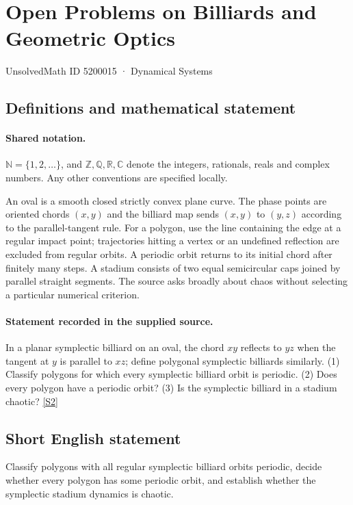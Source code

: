 \documentclass[11pt]{article}
\newcommand{\sref}[2]{\hyperlink{source:#1:#2}{[S#2]}}
\begin{document}
\setcounter{section}{5200014}
\section{Open Problems on Billiards and Geometric Optics}\label{5200015}
{\small\sffamily UnsolvedMath ID 5200015 · Dynamical Systems}
\subsection{Definitions and mathematical statement}

\paragraph{Shared notation.}$\mathbb N=\{1,2,\ldots\}$, and $\mathbb Z,\mathbb Q,\mathbb R,\mathbb C$ denote the integers, rationals, reals and complex numbers. Any other conventions are specified locally.


An oval is a smooth closed strictly convex plane curve. The phase points are oriented chords $(x,y)$ and the billiard map sends $(x,y)$ to $(y,z)$ according to the parallel-tangent rule. For a polygon, use the line containing the edge at a regular impact point; trajectories hitting a vertex or an undefined reflection are excluded from regular orbits. A periodic orbit returns to its initial chord after finitely many steps. A stadium consists of two equal semicircular caps joined by parallel straight segments. The source asks broadly about chaos without selecting a particular numerical criterion.
\paragraph{Statement recorded in the supplied source.}
In a planar symplectic billiard on an oval, the chord $xy$ reflects to $yz$ when the tangent at $y$ is parallel to $xz$; define polygonal symplectic billiards similarly. (1) Classify polygons for which every symplectic billiard orbit is periodic. (2) Does every polygon have a periodic orbit? (3) Is the symplectic billiard in a stadium chaotic? \sref{5200015}{2}
\subsection{Short English statement}
Classify polygons with all regular symplectic billiard orbits periodic, decide whether every polygon has some periodic orbit, and establish whether the symplectic stadium dynamics is chaotic.
\end{document}
